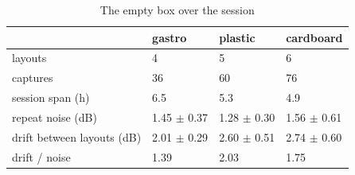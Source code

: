 \begin{table}
\caption{The empty box over the session}
\label{tab:empty_box_session}
\begin{tabular}{llll}
\toprule
 & gastro & plastic & cardboard \\
\midrule
layouts & 4 & 5 & 6 \\
captures & 36 & 60 & 76 \\
session span (h) & 6.5 & 5.3 & 4.9 \\
repeat noise (dB) & 1.45 $\pm$ 0.37 & 1.28 $\pm$ 0.30 & 1.56 $\pm$ 0.61 \\
drift between layouts (dB) & 2.01 $\pm$ 0.29 & 2.60 $\pm$ 0.51 & 2.74 $\pm$ 0.60 \\
drift / noise & 1.39 & 2.03 & 1.75 \\
\bottomrule
\end{tabular}
\end{table}
